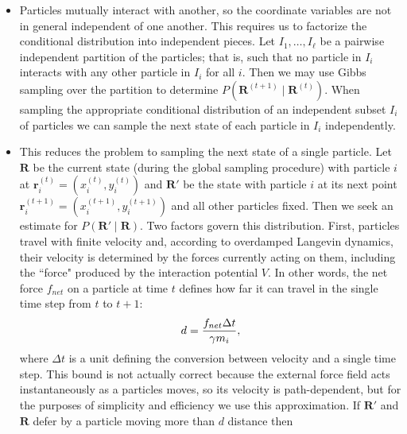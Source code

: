 \documentclass[12pt,letterpaper]{article}
\newcommand{\mb}{\mathbf}
\begin{document}
\begin{itemize}
\begin{align*}
P(\mb{R}^{(t+1)}) = \sum_{\mb{R}}P(\mb{R}^{(t+1)} \mid \mb{R}^{(t)})P(\mb{R}^{(t)} = \mb{R}),
\end{align*}
which reduces to
\begin{align*}
P(\mb{R}^{(t+1)}) = P(\mb{R}^{(t+1)} \mid \mb{R}^{(t)})
\end{align*}
upon fixing $\mb{R}^{(t)}$. So we must determine the conditional distribution $P(\mb{R}^{(t+1)} \mid \mb{R}^{(t)})$.
\item Particles mutually interact with another, so the coordinate variables are not in general independent of one another. This requires us to factorize the conditional distribution into independent pieces. Let $I_{1}, \ldots, I_{\ell}$ be a pairwise independent partition of the particles; that is, such that no particle in $I_{i}$ interacts with any other particle in $I_{i}$ for all $i$. Then we may use Gibbs sampling over the partition to determine $P(\mb{R}^{(t+1)} \mid \mb{R}^{(t)})$. When sampling the appropriate conditional distribution of an independent subset $I_{i}$ of particles we can sample the next state of each particle in $I_{i}$ independently.
\item This reduces the problem to sampling the next state of a single particle. Let $\mb{R}$ be the current state (during the global sampling procedure) with particle $i$ at $\mb{r}^{(t)}_{i} = (x^{(t)}_{i}, y^{(t)}_{i})$ and $\mb{R}'$ be the state with particle $i$ at its next point $\mb{r}^{(t+1)}_{i} = (x^{(t+1)}_{i}, y^{(t+1)}_{i})$ and all other particles fixed. Then we seek an estimate for $P(\mb{R}' \mid \mb{R})$. Two factors govern this distribution. First, particles travel with finite velocity and, according to overdamped Langevin dynamics, their velocity is determined by the forces currently acting on them, including the ``force" produced by the interaction potential $V$. In other words, the net force $f_{net}$ on a particle at time $t$ defines how far it can travel in the single time step from $t$ to $t+1$:
\begin{align*}
d = {f_{net}\Delta t \over \gamma m_{i}},
\end{align*}
where $\Delta t$ is a unit defining the conversion between velocity and a single time step. This bound is not actually correct because the external force field acts instantaneously as a particles moves, so its velocity is path-dependent, but for the purposes of simplicity and efficiency we use this approximation. If $\mb{R}'$ and $\mb{R}$ defer by a particle moving more than $d$ distance then

\end{itemize}
\end{document}
